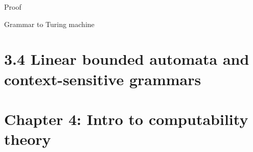 \documentclass[handout]{beamer}
\begin{document}
\begin{frame}{Proof}

    
	

\end{frame}


\begin{frame}{Grammar to Turing machine}

    

\end{frame}



\section{3.4 Linear bounded automata and context-sensitive grammars}


\section{\sc Chapter 4: Intro to computability theory}
\end{document}
